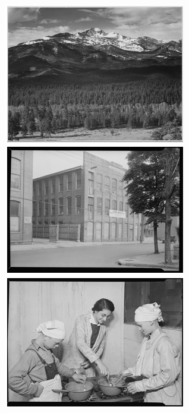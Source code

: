 \begin{enumerate}
\begin{figure}[H]
	\centering
	\begin{subfigure}[b]{0.4\linewidth}
		\includegraphics[width=\linewidth]{img/ColourisationOriginal.png}

\end{subfigure}
\end{figure}
\end{enumerate}
